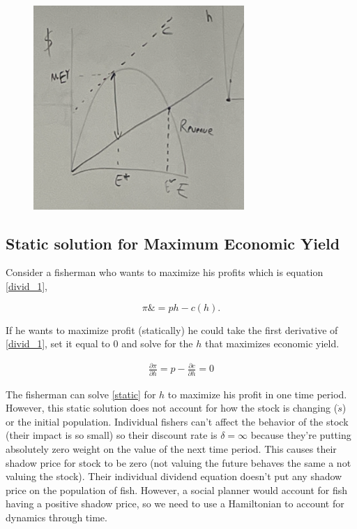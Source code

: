 \documentclass{article}
\begin{document}
\begin{figure}[htp]
    \centering
    \includegraphics[width=8cm]{Screen Shot 2023-03-01 at 9.38.11 AM.png}
    \caption{}
    \label{max_econ_yeild}
\end{figure}

\subsection{Static solution for Maximum Economic Yield}
Consider a fisherman who wants to maximize his profits which is equation \ref{divid_1},

$$\pi \&= ph - c(h).$$

If he wants to maximize profit (statically) he could take the first derivative of \ref{divid_1}, set it equal to 0 and solve for the $h$ that maximizes economic yield. 

\begin{align}
    \frac{\partial \pi}{\partial h} = p - \frac{\partial c}{\partial h} = 0 \label{static}
\end{align}

The fisherman can solve \ref{static} for $h$ to maximize his profit in one time period. \\

However, this static solution does not account for how the stock is changing ($\dot s$) or the initial population. Individual fishers can't affect the behavior of the stock (their impact is so small) so their discount rate is $\delta = \infty$ because they're putting absolutely zero weight on the value of the next time period. This causes their shadow price for stock to be zero (not valuing the future behaves the same a not valuing the stock). Their individual dividend equation doesn't put any shadow price on the population of fish. However, a social planner would account for fish having a positive shadow price, so we need to use a Hamiltonian to account for dynamics through time. 
\end{document}
